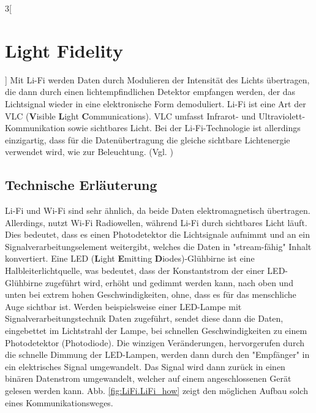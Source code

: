 \begin{multicols}{3}[\section{Light Fidelity}]
Mit Li-Fi werden Daten durch Modulieren der Intensität des Lichts übertragen, die dann durch einen lichtempfindlichen Detektor empfangen werden, der das Lichtsignal  wieder in eine elektronische Form demoduliert. 
Li-Fi ist eine Art der VLC (\textbf{V}isible \textbf{L}ight \textbf{C}ommunications). VLC umfasst Infrarot- und Ultraviolett- Kommunikation sowie sichtbares Licht. Bei der Li-Fi-Technologie ist allerdings einzigartig, dass für die Datenübertragung  die gleiche sichtbare Lichtenergie verwendet wird, wie zur Beleuchtung. (Vgl. \cite{lifi.1})

\subsection*{Technische Erläuterung}
Li-Fi und Wi-Fi sind sehr ähnlich, da beide Daten elektromagnetisch übertragen. Allerdings, nutzt Wi-Fi Radiowellen, während Li-Fi durch sichtbares Licht läuft.  Dies bedeutet, dass es einen Photodetektor die Lichtsignale aufnimmt und an ein Signalverarbeitungselement weitergibt, welches die Daten in "stream-fähig" Inhalt konvertiert.
Eine LED (\textbf{L}ight \textbf{E}mitting \textbf{D}iodes)-Glühbirne ist eine Halbleiterlichtquelle, was bedeutet, dass der Konstantstrom  der einer LED-Glühbirne zugeführt wird, erhöht und gedimmt werden kann, nach oben und unten bei extrem hohen Geschwindigkeiten, ohne, dass es für das menschliche Auge sichtbar ist.
Werden beispielsweise einer LED-Lampe mit Signalverarbeitungstechnik Daten zugeführt, sendet diese dann die Daten, eingebettet im Lichtstrahl der Lampe, bei schnellen Geschwindigkeiten zu einem Photodetektor (Photodiode).
Die winzigen Veränderungen, hervorgerufen durch die schnelle Dimmung der LED-Lampen, werden dann durch den "Empfänger" in ein elektrisches Signal umgewandelt.
Das Signal wird dann zurück in einen binären Datenstrom umgewandelt, welcher auf einem angeschlossenen Gerät gelesen werden kann.
Abb. \ref{fig:LiFi.LiFi_how} zeigt den möglichen Aufbau solch eines Kommunikationsweges.


\end{multicols}

